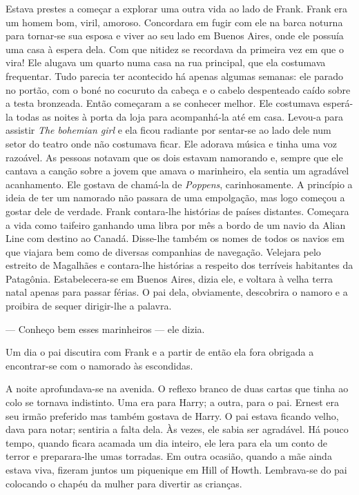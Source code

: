 Estava prestes a começar a explorar uma outra vida ao lado de Frank.
Frank era um homem bom, viril, amoroso. Concordara em fugir com ele na
barca noturna para tornar-se sua esposa e viver ao seu lado em Buenos
Aires, onde ele possuía uma casa à espera dela. Com que nitidez se
recordava da primeira vez em que o vira! Ele alugava um quarto numa
casa na rua principal, que ela costumava frequentar. Tudo parecia
ter acontecido há apenas algumas semanas: ele parado no portão, com o
boné no cocuruto da cabeça e o cabelo despenteado caído sobre a testa
bronzeada. Então começaram a se conhecer melhor. Ele costumava
esperá-la todas as noites à porta da loja para acompanhá-la até em
casa. Levou-a para assistir \textit{The bohemian girl} e ela ficou radiante
por sentar-se ao lado dele num setor do teatro onde não costumava
ficar. Ele adorava música e tinha uma voz razoável. As pessoas notavam
que os dois estavam namorando e, sempre que ele cantava a canção sobre
a jovem que amava o marinheiro, ela sentia um agradável acanhamento.
Ele gostava de chamá-la de \textit{Poppens},
carinhosamente. A princípio a ideia de ter um namorado não passara de
uma empolgação, mas logo começou a gostar dele de verdade. Frank
contara-lhe histórias de países distantes. Começara a vida como
taifeiro ganhando uma libra por mês a bordo de um navio da Alian Line
com destino ao Canadá. Disse-lhe também os nomes de todos os navios
em que viajara bem como de diversas companhias de navegação. Velejara
pelo estreito de Magalhães e contara-lhe histórias a respeito dos
terríveis habitantes da Patagônia. Estabelecera-se em Buenos Aires,
dizia ele, e voltara à velha terra natal apenas para passar férias. O
pai dela, obviamente, descobrira o namoro e a proibira de sequer
dirigir-lhe a palavra.

--- Conheço bem esses marinheiros --- ele dizia.

Um dia o pai discutira com Frank e a partir de então ela fora obrigada
a encontrar-se com o namorado às escondidas.

A noite aprofundava-se na avenida. O reflexo branco de duas cartas que
tinha ao colo se tornava indistinto. Uma era para Harry; a outra, para
o pai. Ernest era seu irmão preferido mas também gostava de Harry. O
pai estava ficando velho, dava para notar; sentiria a falta dela. Às
vezes, ele sabia ser agradável. Há pouco tempo, quando ficara acamada
um dia inteiro, ele lera para ela um conto de terror e preparara-lhe
umas torradas. Em outra ocasião, quando a mãe ainda estava viva,
fizeram juntos um piquenique em Hill of Howth. Lembrava-se do pai
colocando o chapéu da mulher para divertir as crianças.

